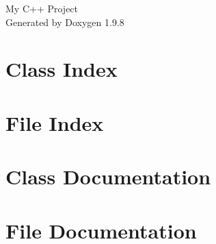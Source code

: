 \documentclass[twoside]{book}
\newcommand{\+}{\discretionary{\mbox{\scriptsize$\hookleftarrow$}}{}{}}
\newcommand{\clearemptydoublepage}{%
    \newpage{\pagestyle{empty}\cleardoublepage}%
  }
\begin{document}
  \raggedbottom
    \hypersetup{pageanchor=false,
                bookmarksnumbered=true,
                pdfencoding=unicode
               }
  \begin{titlepage}
  \vspace*{7cm}
  \begin{center}%
  {\Large My C++ Project}\\
  \vspace*{1cm}
  {\large Generated by Doxygen 1.9.8}\\
  \end{center}
  \end{titlepage}
  \clearemptydoublepage
  \tableofcontents
  \clearemptydoublepage
  \hypersetup{pageanchor=true}
\chapter{Class Index}

\chapter{File Index}

\chapter{Class Documentation}


\chapter{File Documentation}


  \backmatter
  \newpage
  \clearemptydoublepage
  \printindex
\end{document}

